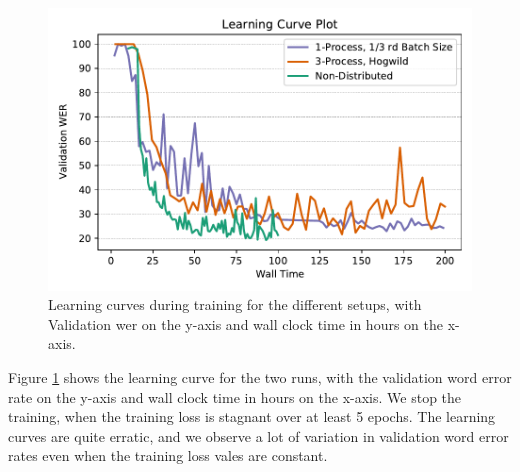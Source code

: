 \begin{figure}[ht]
  \begin{center}
    \includegraphics[width=\textwidth]{images/learning_curve_8000_hogwild.pdf} 
    \caption{Learning curves during training for the different setups, with Validation \acrshort{wer} on the y-axis and wall clock time in hours on the x-axis.}
    \label{fig:learningcurve_async}
  \end{center}
\end{figure}

Figure \ref{fig:learningcurve_async} shows the learning curve for the two runs, with the validation word error rate on the y-axis and wall clock time in hours on the x-axis. We stop the training, when the training loss is stagnant over at least 5 epochs. The learning curves are quite erratic, and we observe a lot of variation in validation word error rates even when the training loss vales are constant. 



